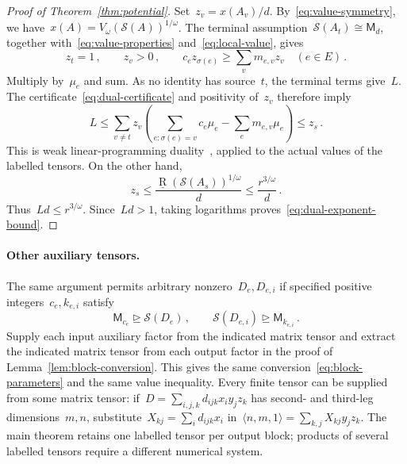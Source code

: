\documentclass[11pt,letterpaper]{article}
\theoremstyle{definition}
\numberwithin{equation}{section}
\newcommand{\MM}{\mathsf M}
\newcommand{\br}{\underline{\operatorname{R}}}
\newcommand{\degen}{\unrhd}
\begin{document}
\begin{proof}[Proof of Theorem~\ref{thm:potential}]
Set~$z_v=x(A_v)/d$. By~\eqref{eq:value-symmetry}, we have~$x(A)=V_\omega(\mathcal S(A))^{1/\omega}$. The terminal assumption~$\mathcal S(A_t)\cong\MM_d$, together with~\eqref{eq:value-properties} and~\eqref{eq:local-value}, gives
\begin{equation}\label{eq:identity-lp}
 z_t=1\,,\qquad z_v>0\,,\qquad
 c_ez_{\sigma(e)}\geq\sum_v m_{e,v}z_v\quad(e\in E)\,.
\end{equation}
Multiply by~$\mu_e$ and sum. As no identity has source~$t$, the terminal terms give~$L$. The certificate~\eqref{eq:dual-certificate} and positivity of~$z_v$ therefore imply
\begin{equation*}
 L\leq\sum_{v\ne t}z_v
 \left(\sum_{e:\sigma(e)=v}c_e\mu_e-\sum_e m_{e,v}\mu_e\right)
 \leq z_s\,.
\end{equation*}
This is weak linear-programming duality~\cite{Goemans}, applied to the actual values of the labelled tensors. On the other hand,
\begin{equation*}
 z_s\leq\frac{\br(\mathcal S(A_s))^{1/\omega}}{d}
 \leq\frac{r^{3/\omega}}{d}\,.
\end{equation*}
Thus~$Ld\leq r^{3/\omega}$. Since~$Ld>1$, taking logarithms proves~\eqref{eq:dual-exponent-bound}.
\end{proof}

\paragraph{Other auxiliary tensors.}
The same argument permits arbitrary nonzero~$D_e,D_{e,i}$ if specified positive integers~$c_e,k_{e,i}$ satisfy
\begin{equation}\label{eq:general-auxiliaries}
 \MM_{c_e}\degen\mathcal S(D_e)\,,\qquad
 \mathcal S(D_{e,i})\degen\MM_{k_{e,i}}\,.
\end{equation}
Supply each input auxiliary factor from the indicated matrix tensor and extract the indicated matrix tensor from each output factor in the proof of Lemma~\ref{lem:block-conversion}. This gives the same conversion~\eqref{eq:block-parameters} and the same value inequality. Every finite tensor can be supplied from some matrix tensor: if~$D=\sum_{i,j,k}d_{ijk}x_i y_jz_k$ has second- and third-leg dimensions~$m,n$, substitute~$X_{kj}=\sum_i d_{ijk}x_i$ in~$\langle n,m,1\rangle=\sum_{k,j}X_{kj}y_jz_k$. The main theorem retains one labelled tensor per output block; products of several labelled tensors require a different numerical system.
\end{document}
